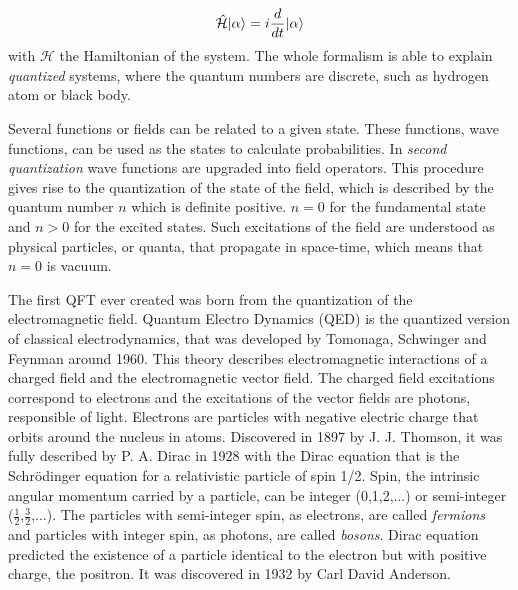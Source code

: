 \begin{equation}
  \label{eq:Schrodinger}
  \hat{\mathcal{H}}| \alpha\rangle=i\frac{d}{dt}| \alpha\rangle
\end{equation}with $\mathcal{H}$ the Hamiltonian of the system. The whole formalism is able to explain \textit{quantized} systems, where the quantum numbers are discrete, such as hydrogen atom or black body.

Several functions or fields can be related to a given state. These functions, wave functions, can be used as the states to calculate probabilities. In \textit{second quantization} wave functions are upgraded into field operators. This procedure gives rise to the quantization of the state of the field, which is described by the quantum number $n$ which is definite positive. $n=0$ for the fundamental state and $n>0$ for the excited states. Such excitations of the field are understood as physical particles, or quanta, that propagate in space-time, which means that $n=0$ is vacuum. 

The first QFT ever created was born from the quantization of the electromagnetic field. Quantum Electro Dynamics (QED) is the quantized version of classical electrodynamics, that was developed by Tomonaga, Schwinger and Feynman around 1960. This theory describes electromagnetic interactions of a charged field and the electromagnetic vector field. The charged field excitations correspond to electrons and the excitations of the vector fields are photons, responsible of light. Electrons are particles with negative electric charge that orbits around the nucleus in atoms. Discovered in 1897 by J. J. Thomson, it was fully described by P. A. Dirac in 1928 with the Dirac equation that is the Schr\"{o}dinger equation for a relativistic particle of spin 1/2. Spin, the intrinsic angular momentum carried by a particle, can be integer (0,1,2,...) or semi-integer ($\frac{1}{2}$,$\frac{3}{2}$,...). The particles with semi-integer spin, as electrons, are called \textit{fermions} and particles with integer spin, as photons, are called \textit{bosons}. Dirac equation predicted the existence of a particle identical to the electron but with positive charge, the positron. It was discovered in 1932 by Carl David Anderson.

